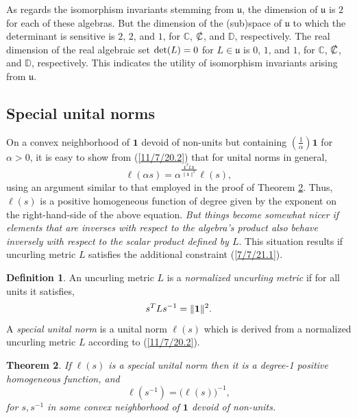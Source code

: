 \documentclass{amsart}
\numberwithin{equation}{section}
\newtheorem{theorem}{Theorem}
\theoremstyle{definition}
\newtheorem{definition}[theorem]{Definition}
\numberwithin{theorem}{section}
\begin{document}
  As regards the isomorphism invariants stemming from $\mathfrak{u}$, the dimension of $\mathfrak{u}$ is $2$ for each of these algebras.  But the dimension of the (sub)space of $\mathfrak{u}$ to which the determinant is sensitive is $2$, $2$, and $1$, for $\mathbb{C}$, $\slashed{\mathbb{C}}$, and $\mathbb{D}$, respectively.  The real dimension of the real algebraic set ${\rm det}(L) = 0$ for $L\in\mathfrak{u}$ is $0$, $1$, and $1$, for $\mathbb{C}$, $\slashed{\mathbb{C}}$, and $\mathbb{D}$, respectively.  This indicates the utility of isomorphism invariants arising from $\mathfrak{u}$. 

\subsection{Special unital norms}

On a convex neighborhood of $\mathbf{1}$ devoid of non-units but containing $\left(\frac{1}{\alpha}\right)\mathbf{1}$ for $\alpha>0$, it is easy to show from (\ref{11/7/20.2}) that for unital norms in general, \[  \ell(\alpha s) = \alpha^{\frac{\mathbf{1}^T L \mathbf{1}}{\|\mathbf{1}\|^2}} \ell(s),\] using an argument similar to that employed in the proof of Theorem \ref{9/24/23.1}. Thus, $ \ell(s)$ is a positive homogeneous function of degree given by the exponent on the right-hand-side of the above equation.  
   {\it But things become somewhat nicer if elements that are inverses with respect to the algebra's product also behave inversely with respect to the scalar product defined by $L$}.  
    This situation results if uncurling metric $L$ satisfies the additional constraint (\ref{7/7/21.1}).
 
\begin{definition}\label{9/20/23.1} An uncurling metric $L$ is a {\it normalized uncurling metric} if for all units it satisfies, \begin{equation} \label{7/7/21.1} s^TLs^{-1} =\|{\bf 1}\|^2.\end{equation}  A {\it special unital norm} is a unital norm $ \ell(s)$ which is derived from a normalized uncurling metric $L$ according to (\ref{11/7/20.2}). 
\end{definition}

\begin{theorem}\label{9/24/23.1} If $ \ell(s)$ is a special unital norm then it is a degree-1 positive homogeneous function, and
\begin{equation}\label{5/23/23.3}  \ell(s^{-1}) = \big( \ell(s)\big)^{-1}, \end{equation} for $s,s^{-1}$ in some convex neighborhood of $\mathbf{1}$ devoid of non-units. \end{theorem}
\end{document}
